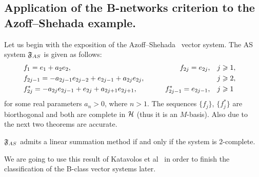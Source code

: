 \documentclass[12pt]{amsart}
\begin{document}
    \subsection{Application of the B-networks criterion to the Azoff--Shehada example.}
      Let us begin with the exposition of the Azoff--Shehada~\cite{azoff} vector system.
      The AS system $\fsys_{AS}$ is given as follows:
      \begin{equation}
        \label{as-system}
        \begin{aligned}
          &f_1 = e_1 + a_2 e_2, \qquad &f_{2j}=e_{2j}, \quad&j \geq 1,&\\
          &f_{2j-1}=-a_{2j-1}e_{2j-2} + e_{2j-1} + a_{2j}e_{2j}, \qquad &\makebox[5em]{} \quad&j \geq 2,&\\
          &f^*_{2j}=-a_{2j}e_{2j-1}+e_{2j}+a_{2j+1}e_{2j+1}, \qquad &f^*_{2j-1}=e_{2j-1}, \quad&j \geq 1&
        \end{aligned}
      \end{equation}
        for some real parameters $a_n > 0$, where $n > 1$.
      The sequences $\{f_j\}$, $\{f^*_j\}$ are biorthogonal and both are complete in $\cal{H}$ (thus it is an $M$-basis).
      Also due to~\cite{katavolos} the next two theorems are accurate.
      \begin{theorem}
        \label{thm-katavolos-1}
          $\fsys_{AS}$ admits a linear summation method if and only if the system is $2$-complete.
      \end{theorem}
      \begin{note}
        We are going to use this result of Katavolos et al~\cite{katavolos} in order to finish the classification of the B-class vector systems later.
      \end{note}
\end{document}
